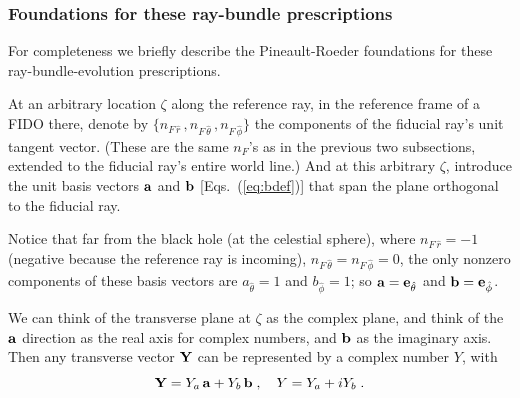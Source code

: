 \documentclass[12pt]{iopart}
\begin{document}
\subsubsection{Foundations for these ray-bundle prescriptions}

For completeness we briefly describe the Pineault-Roeder \cite{PR1,PR2} 
foundations for these ray-bundle-evolution prescriptions.

At an arbitrary location $\zeta$ along the reference ray, in the reference frame
of a FIDO there, denote by $\{n_{F\,\hat r}\,, n_{F\, \hat\theta}\,, n_{F\, \hat \phi}\}$
the components of the fiducial ray's unit tangent vector.  (These are the same
$n_F$'s as in the previous two subsections, extended to the fiducial ray's
entire world line.)  And at this arbitrary $\zeta$, introduce the unit basis vectors 
$\bf a$ and $\bf b$ [Eqs.\ (\ref{eq:bdef})] that 
span the plane orthogonal to the fiducial ray.

Notice that far from the black hole (at the celestial sphere), 
where $n_{F\,\hat r}=-1$ (negative because the 
reference ray is incoming), $n_{F\,\hat\theta} = n_{F\,\hat\phi}=0$, the 
only nonzero components of these basis vectors are $a_{\hat \theta} = 1$ and
$b_{\hat \phi}=1$; so ${\bf a} = {\bf e}_{\hat \theta}$ and ${\bf  b} = {\bf  e}_{\hat \phi}$.

We can think of the transverse plane at $\zeta$ as the complex plane, and 
think of the $\bf a$ direction as the real axis for complex numbers, and 
$\bf b$ as the imaginary axis.  Then any transverse vector $\bf Y$ can be
represented by a complex number $Y$, with 
\begin{equation}
{\bf Y} = Y_a \,{\bf a} + Y_b\, {\bf b}\;, \quad Y = Y_a + i Y_b\;.
\label{eq:VecAsComplexNo}
\end{equation}
\end{document}
